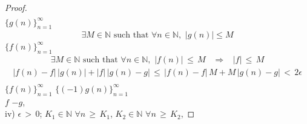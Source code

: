 \begin{theorem}
\begin{proof}
\begin{align*}
    \end{align*}
     $\{g(n)\}_{n = 1}^{\infty}$ 
    \begin{align*}
        \exists M \in \mathbb{N} \text{ such that } \forall n \in \mathbb{N}, \hspace{4pt} \lvert g(n) \rvert \leq M 
    \end{align*}
     $\{f(n)\}_{n = 1}^{\infty}$ 
    \begin{align*}
        \exists M \in \mathbb{N} \text{ such that } \forall n \in \mathbb{N}, \hspace{4pt} \lvert f(n) \rvert \hspace{2pt} \leq \hspace{2pt} M \hspace{10pt} \Longrightarrow \hspace{10pt} \lvert f \rvert \hspace{2pt} \leq \hspace{2pt} M  
    \end{align*}
    \begin{align*}
        \lvert f(n) - f \rvert \hspace{2pt} \lvert g(n) \rvert + \lvert f \rvert \hspace{2pt} \lvert g(n) - g \rvert \hspace{2pt} \leq \hspace{2pt} \lvert f(n) - f \rvert \hspace{2pt} M + M \hspace{2pt} \lvert g(n) - g \rvert \hspace{2pt} < \hspace{2pt} 2\epsilon \\[4ex]
    \end{align*}
     $\{f(n)\}_{n = 1}^{\infty}$  $\{(-1)g(n)\}_{n = 1}^{\infty}$  \\
     $f$  $-g$,  \\
    iv)  $\epsilon \hspace{2pt} > \hspace{2pt} 0$;  $K_{1} \in \mathbb{N}$  $\forall n \hspace{2pt} \geq \hspace{2pt} K_{1}$,  $K_{2} \in \mathbb{N}$  $\forall n \hspace{2pt} \geq \hspace{2pt} K_{2}$, 

\end{proof}
\end{theorem}

